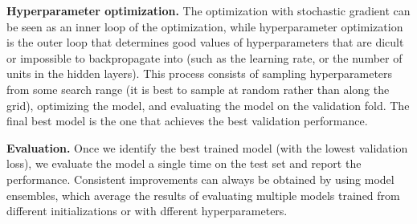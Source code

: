 \textbf{Hyperparameter optimization.} The optimization with stochastic gradient can be seen as an inner loop of the optimization, while hyperparameter optimization is the outer loop that determines good values of hyperparameters that are dicult or impossible to backpropagate into (such as the learning rate, or the number of units in the hidden layers). This process consists of sampling hyperparameters from some search range (it is best to sample at random rather than along the grid), optimizing the model, and evaluating the model on the validation fold. The final best model is the one that achieves the best validation performance.

\textbf{Evaluation.} Once we identify the best trained model (with the lowest validation loss), we evaluate the model a single time on the test set and report the performance. Consistent improvements can always be obtained by using model ensembles, which average the results of evaluating multiple models trained from different initializations or with dfferent hyperparameters.
